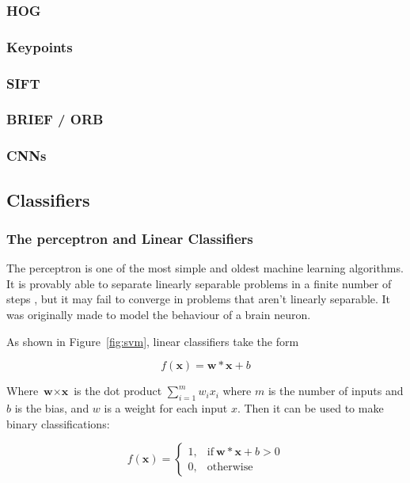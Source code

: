 \documentclass{article}
\begin{document}
\begin{multicols}{2}
\subsubsection{HOG}

\subsubsection{Keypoints}

\subsubsection{SIFT}

\subsubsection{BRIEF / ORB}

\subsubsection{CNNs}

\subsection{Classifiers}

\subsubsection{The perceptron and Linear Classifiers}
The perceptron \cite{rosenblatt} is one of the most simple and oldest machine learning algorithms. It is provably able to separate linearly separable problems in a finite number of steps \cite{charnes}, but it may fail to converge in problems that aren't linearly separable. It was originally made to model the behaviour of a brain neuron.

As shown in Figure~\ref{fig:svm}, linear classifiers take the form 

\begin{equation}
	f(\textbf{x}) = \textbf{w} * \textbf{x} + b
\end{equation}

Where $\textbf{w} \times \textbf{x}$ is the dot product $\sum^{m}_{i=1} w_{i} x_{i}$ where $m$ is the number of inputs and $b$ is the bias, and $w$ is a weight for each input $x$. Then it can be used to make binary classifications:

\begin{equation}
	f(\textbf{x}) =
	\begin{cases}
		1, & \text{if}\ \textbf{w} * \textbf{x} + b > 0 \\
		0, & \text{otherwise}
	\end{cases}
\end{equation}


\end{multicols}
\end{document}

